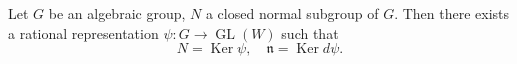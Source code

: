 Let $G$ be an algebraic group, $N$ a closed normal subgroup of $G$. Then there exists a rational representation $\psi: G \rightarrow \operatorname{GL}(W)$ such that
$$N = \operatorname{Ker} \psi, \quad \mathfrak{n} = \operatorname{Ker} d\psi.$$
